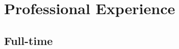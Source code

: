 \documentclass[11pt,a4paper,roman]{moderncv}
\begin{document}
\makecvtitle



\newcommand\seeabovedesc{(\textit{See description above.})}

\newcommand\daterange[2]{#1\,--\,#2}

\newcommand\altamont{Altamont, Tennessee, USA}
\newcommand\austin{Austin, Texas, USA}
\newcommand\centurion{Centurion, South Africa}
\newcommand\chattanooga{Chattanooga, Tennessee, USA}
\newcommand\chippewafalls{Chippewa Falls, Wisconsin, USA}
\newcommand\london{London, UK}
\newcommand\portland{Portland, Oregon, USA}
\newcommand\pretoria{Pretoria, South Africa}
\newcommand\sanfrancisco{San Francisco, California, USA}
\newcommand\stlouis{St. Louis, Missouri, USA}
\newcommand\utrecht{Utrecht, The Netherlands}
\newcommand\whitemarsh{White Marsh, Maryland, USA}

\newcommand\uu{Utrecht University}
\newcommand\wustl{Washington University in St. Louis}
\newcommand\wustlshort{Washington University}
\newcommand\ut{University of Texas at Austin}



\newcommand\Cpp{C{}\texttt{++}\xspace}


\section{Professional Experience}


\subsection{Full-time}
\end{document}

